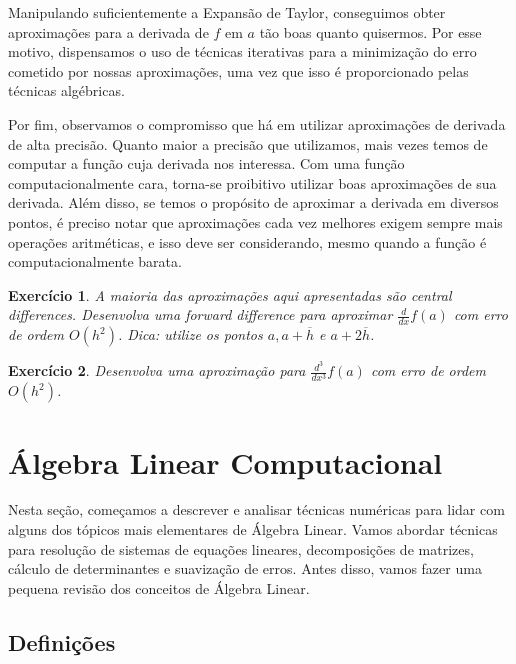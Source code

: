 \documentclass[]{article}
\newtheorem{exercicio}{Exercício}
\numberwithin{equation}{section}
\begin{document}
Manipulando suficientemente a Expansão de Taylor, conseguimos obter aproximações para a derivada de $f$ em $a$ tão boas quanto quisermos. Por esse motivo, dispensamos o uso de técnicas iterativas para a minimização do erro cometido por nossas aproximações, uma vez que isso é proporcionado pelas técnicas algébricas.

Por fim, observamos o compromisso que há em utilizar aproximações de derivada de alta precisão. Quanto maior a precisão que utilizamos, mais vezes temos de computar a função cuja derivada nos interessa. Com uma função computacionalmente cara, torna-se proibitivo utilizar boas aproximações de sua derivada. Além disso, se temos o propósito de aproximar a derivada em diversos pontos, é preciso notar que aproximações cada vez melhores exigem sempre mais operações aritméticas, e isso deve ser considerando, mesmo quando a função é computacionalmente barata.

\begin{exercicio}
	A maioria das aproximações aqui apresentadas são central differences. Desenvolva uma forward difference para aproximar $\frac{d}{dx} f(a)$ com erro de ordem $O(h^2)$. Dica: utilize os pontos $a, a + \overline{h}$ e $a + 2\overline{h}$.
\end{exercicio}

\begin{exercicio}
	Desenvolva uma aproximação para $\frac{d^3}{dx^3} f(a)$ com erro de ordem $O(h^2)$.
\end{exercicio}

\section{Álgebra Linear Computacional}

Nesta seção, começamos a descrever e analisar técnicas numéricas para lidar com alguns dos tópicos mais elementares de Álgebra Linear. Vamos abordar técnicas para resolução de sistemas de equações lineares, decomposições de matrizes, cálculo de determinantes e suavização de erros. Antes disso, vamos fazer uma pequena revisão dos conceitos de Álgebra Linear.

\subsection{Definições}
\end{document}
